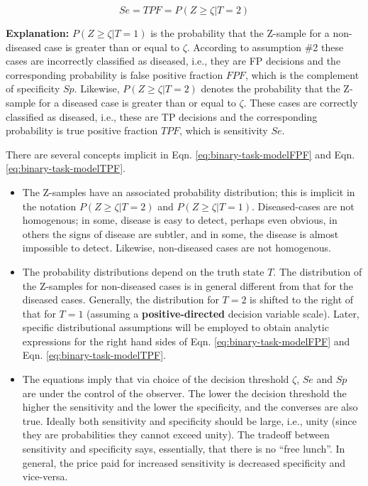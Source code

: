 \documentclass[
]{book}
\providecommand{\tightlist}{%
  \setlength{\itemsep}{0pt}\setlength{\parskip}{0pt}}
\begin{document}
\begin{equation} 
Se=TPF=P(Z\ge \zeta|T=2)
\label{eq:binary-task-modelTPF}
\end{equation}

\textbf{Explanation:} \(P(Z\ge \zeta|T=1)\) is the probability that the Z-sample for a non-diseased case is greater than or equal to \(\zeta\). According to assumption \#2 these cases are incorrectly classified as diseased, i.e., they are FP decisions and the corresponding probability is false positive fraction \(FPF\), which is the complement of specificity \(Sp\). Likewise, \(P(Z\ge \zeta|T=2)\) denotes the probability that the Z-sample for a diseased case is greater than or equal to \(\zeta\). These cases are correctly classified as diseased, i.e., these are TP decisions and the corresponding probability is true positive fraction \(TPF\), which is sensitivity \(Se\).

There are several concepts implicit in Eqn. \eqref{eq:binary-task-modelFPF} and Eqn. \eqref{eq:binary-task-modelTPF}.

\begin{itemize}
\tightlist
\item
  The Z-samples have an associated probability distribution; this is implicit in the notation \(P(Z\ge \zeta|T=2)\) and \(P(Z\ge \zeta|T=1)\). Diseased-cases are not homogenous; in some, disease is easy to detect, perhaps even obvious, in others the signs of disease are subtler, and in some, the disease is almost impossible to detect. Likewise, non-diseased cases are not homogenous.
\item
  The probability distributions depend on the truth state \(T\). The distribution of the Z-samples for non-diseased cases is in general different from that for the diseased cases. Generally, the distribution for \(T = 2\) is shifted to the right of that for \(T = 1\) (assuming a \textbf{positive-directed} decision variable scale). Later, specific distributional assumptions will be employed to obtain analytic expressions for the right hand sides of Eqn. \eqref{eq:binary-task-modelFPF} and Eqn. \eqref{eq:binary-task-modelTPF}.
\item
  The equations imply that via choice of the decision threshold \(\zeta\), \(Se\) and \(Sp\) are under the control of the observer. The lower the decision threshold the higher the sensitivity and the lower the specificity, and the converses are also true. Ideally both sensitivity and specificity should be large, i.e., unity (since they are probabilities they cannot exceed unity). The tradeoff between sensitivity and specificity says, essentially, that there is no ``free lunch''. In general, the price paid for increased sensitivity is decreased specificity and vice-versa.
\end{itemize}
\end{document}
